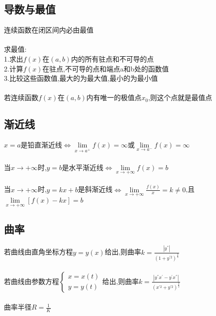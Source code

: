 \documentclass{article}
\begin{document}
\begin{flushleft}
	\subsection{导数与最值}
	
	连续函数在闭区间内必由最值\\
	~\\
	求最值:\\
	1.求出$f(x)$在$(a,b)$内的所有驻点和不可导的点\\
	2.计算$f(x)$在驻点,不可导的点和端点a和b处的函数值\\
	3.比较这些函数值,最大的为最大值,最小的为最小值\\
	~\\
	若连续函数$f(x)$在$(a,b)$内有唯一的极值点$x_0$,则这个点就是最值点\\
	
	\subsection{渐近线}
	
	$x=a$是铅直渐近线$\Leftrightarrow \lim\limits_{x\to a^+}f(x)=\infty$或$\lim\limits_{x\to a^-}f(x)=\infty$\\
	~\\
	当$x\to +\infty$时,$y=b$是水平渐近线$\Leftrightarrow \lim\limits_{x\to +\infty}f(x)=b$\\
	~\\
	当$x\to +\infty$时,$y=kx+b$是斜渐近线$\Leftrightarrow \lim\limits_{x\to +\infty}\frac{f(x)}{x}=k\neq 0$,且$\lim\limits_{x\to +\infty}[f(x)-kx]=b$\\
	
	\subsection{曲率}
	
	若曲线由直角坐标方程$y=y(x)$给出,则曲率$k=\frac{|y^{''}|}{(1+y^{'2})^{\frac{3}{2}}}$\\
	~\\
	若曲线由参数方程$\left\{
	\begin{array}{rcl}
	x=x(t)\\
	y=y(t)
	\end{array} \right.$给出,则曲率$k=\frac{|y^{''}x^{'}-y^{'}x^{''}|}{(x^{'2}+y^{'2})^{\frac{3}{2}}}$\\
	~\\
	曲率半径$R=\frac{1}{K}$\\
	
\end{flushleft}
\end{document}
